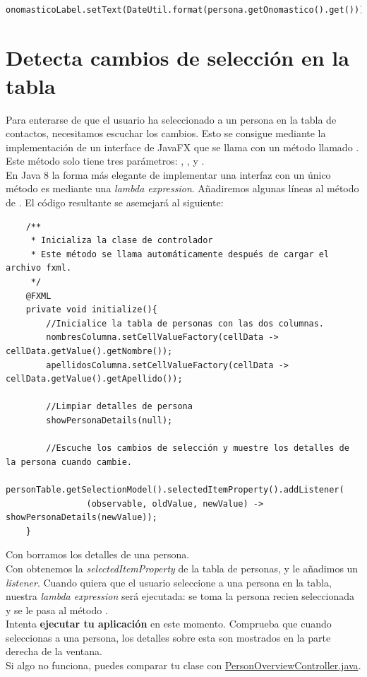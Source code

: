 \begin{verbatim}
    onomasticoLabel.setText(DateUtil.format(persona.getOnomastico().get()));
\end{verbatim}

\section{Detecta cambios de selección en la tabla}
Para enterarse de que el usuario ha seleccionado a un persona en la tabla de contactos, 
necesitamos escuchar los cambios. Esto se consigue mediante la implementación de un interface de JavaFX 
que se llama  con un método llamado . Este método solo tiene tres 
parámetros: , , y . \\
En Java 8 la forma más elegante de implementar una interfaz con un único método es mediante una \textit{lambda expression}. 
Añadiremos algunas líneas al método  de . 
El código resultante se asemejará al siguiente:\\

\begin{verbatim}
    /**
	 * Inicializa la clase de controlador
	 * Este método se llama automáticamente después de cargar el archivo fxml.
	 */
	@FXML
	private void initialize(){
		//Inicialice la tabla de personas con las dos columnas.
		nombresColumna.setCellValueFactory(cellData -> cellData.getValue().getNombre());
		apellidosColumna.setCellValueFactory(cellData -> cellData.getValue().getApellido());

		//Limpiar detalles de persona
		showPersonaDetails(null);

		//Escuche los cambios de selección y muestre los detalles de la persona cuando cambie.
		personTable.getSelectionModel().selectedItemProperty().addListener(
				(observable, oldValue, newValue) -> showPersonaDetails(newValue));
	}
\end{verbatim}

Con  borramos los detalles de una persona.\\
Con  obtenemos la \textit{selectedItemProperty} de la tabla de personas, 
y le añadimos un \textit{listener}. Cuando quiera que el usuario seleccione a una persona en la tabla, 
nuestra \textit{lambda expression} será ejecutada: se toma la persona recien seleccionada y se le pasa al 
método . \\
Intenta \textbf{ejecutar tu aplicación} en este momento. Comprueba que cuando seleccionas a una persona, 
los detalles sobre esta son mostrados en la parte derecha de la ventana. \\
Si algo no funciona, puedes comparar tu clase  con 
\textcolor{azul}{\href{https://github.com/mateomtz199/direccionesapp-part4}{PersonOverviewController.java}}.

